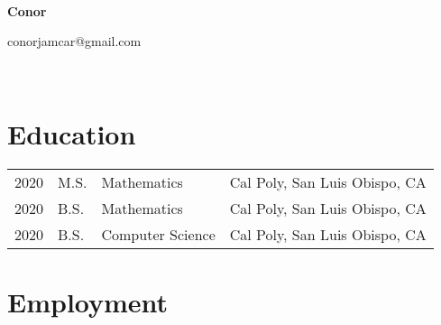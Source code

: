 \documentclass[11pt]{article}
\begin{document}
~
~

\begin{center}
  {
	\fontsize{1.5cm}{1.5cm}
        \textcolor{CalPolyGreen}{\textbf{Conor}}
  }
  ~

  conorjamcar@gmail.com

\end{center}

~
~


\section*{\textcolor{CalPolyGreen}{Education}}
\begin{tabular}{llll}
        2020    & M.S.  & Mathematics           & Cal Poly, San Luis Obispo, CA \\
        2020    & B.S.  & Mathematics           & Cal Poly, San Luis Obispo, CA \\
        2020    & B.S.  & Computer Science      & Cal Poly, San Luis Obispo, CA \\
\end{tabular}

\section*{\textcolor{CalPolyGreen}{Employment}}
\end{document}
